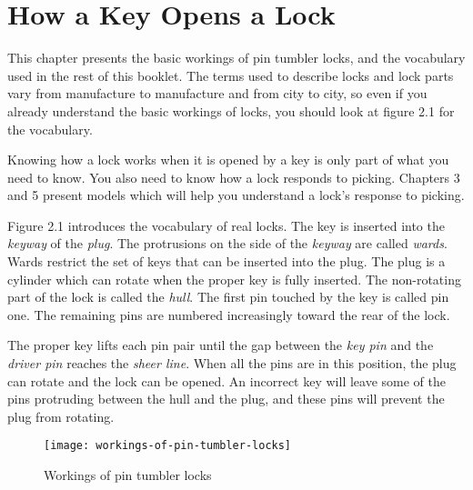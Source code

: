 \chapter{How a Key Opens a Lock}
This chapter presents the basic workings of pin tumbler locks, and the vocabulary used in the rest of this booklet.
The terms used to describe locks and lock parts vary from manufacture to manufacture and from city to city, so even if you already understand the basic workings of locks, you should look at figure 2.1 for the vocabulary.

Knowing how a lock works when it is opened by a key is only part of what you need to know.
You also need to know how a lock responds to picking. Chapters 3 and 5 present models which will help you understand a lock's response to picking.

Figure 2.1 introduces the vocabulary of real locks.
The key is inserted into the \textit{keyway} of the \textit{plug}.
The protrusions on the side of the \textit{keyway} are called \textit{wards}.
Wards restrict the set of keys that can be inserted into the plug.
The plug is a cylinder which can rotate when the proper key is fully inserted.
The non-rotating part of the lock is called the \textit{hull}.
The first pin touched by the key is called pin one.
The remaining pins are numbered increasingly toward the rear of the lock.

The proper key lifts each pin pair until the gap between the \textit{key pin} and the \textit{driver pin} reaches the \textit{sheer line}.
When all the pins are in this position, the plug can rotate and the lock can be opened.
An incorrect key will leave some of the pins protruding between the hull and the plug, and these pins will prevent the plug from rotating.

\begin{figure}[b]
    \texttt{[image: workings-of-pin-tumbler-locks]}
    \caption{Workings of pin tumbler locks}
\end{figure}
